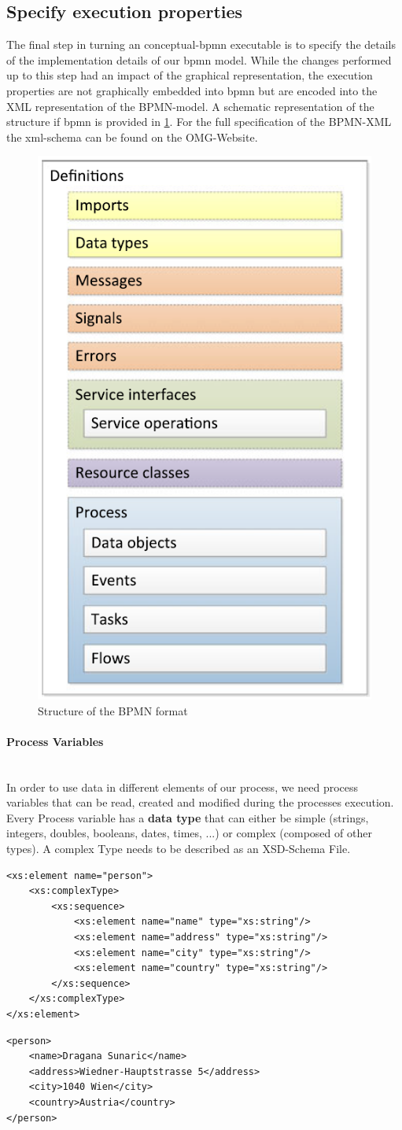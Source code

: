 \subsection{Specify execution properties}
The final step in turning an \gls{conceptual-bpmn} executable is to specify the details of the implementation details of our \gls{bpmn} model. While the changes performed up to this step had an impact of the graphical representation, the execution properties are not graphically embedded into \gls{bpmn} but are encoded into the \gls{XML} representation of the BPMN-model. \cite{fundamentals} A schematic representation of the structure if \gls{bpmn} is provided in \ref{fig:bpmn-schema}. For the full specification of the BPMN-XML the \gls{xml}-schema can be found on the OMG-Website\cite{BPMN-xml-spec}. 
\begin{figure}[H]
		\centering
		\includegraphics[width=0.3\columnwidth]{graphics/bpmn-schema}
		\caption{Structure of the BPMN format \cite{fundamentals}} 
		\label{fig:bpmn-schema} 
\end{figure}


\paragraph{Process Variables}~\\
In order to use data in different elements of our process, we need process variables that can be read, created and modified during the processes execution. Every Process variable has a \textbf{data type} that can either be simple (strings, integers, doubles, booleans, dates, times, ...) or complex (composed of other types). A complex Type needs to be described as an \gls{XSD}-Schema File.\\
\lstset{language=XML}
	\begin{lstlisting}[caption={The \gls{xml}-Schema Definiton for a complex type 'person'},captionpos=b]
<xs:element name="person">
	<xs:complexType>
		<xs:sequence>
			<xs:element name="name" type="xs:string"/>
			<xs:element name="address" type="xs:string"/>
			<xs:element name="city" type="xs:string"/>
			<xs:element name="country" type="xs:string"/>
		</xs:sequence>
	</xs:complexType>
</xs:element>
	\end{lstlisting}
\begin{lstlisting}[caption={An instance of the complex type 'person'},captionpos=b]
<person>
	<name>Dragana Sunaric</name>
	<address>Wiedner-Hauptstrasse 5</address>
	<city>1040 Wien</city>
	<country>Austria</country>
</person>
\end{lstlisting}


